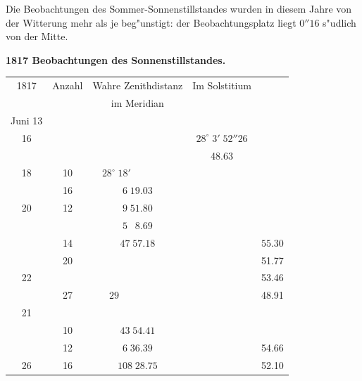 \documentclass[12pt,a4paper]{article}
\begin{document}
Die Beobachtungen des Sommer-Sonnenstillstandes wurden in diesem Jahre von der Witterung
mehr als je beg"unstigt: der Beobachtungsplatz liegt $0''16$ s"udlich von der Mitte.

\begin{center}
\textbf{1817 Beobachtungen des Sonnenstillstandes.}
\end{center}

\begin{center}
\small
\begin{tabular}{c|c|c|c|c}
\toprule
1817 & Anzahl & Wahre Zenithdistanz & Im Solstitium & \\
& & im Meridian & & \\
\midrule
Juni 13 & & & & \\
\phantom{13} 16 & & & $28^{\circ}\;3'\;52''26$ & \\
& & & \phantom{0}\phantom{0}\phantom{0}\phantom{0}\phantom{0}48.63 & \\
\phantom{13} 18 & 10 & $28^{\circ}\;18'\;\phantom{0}\phantom{0}\phantom{0}\phantom{0}\phantom{0}\phantom{0}\phantom{0}\phantom{0}$ & & \\
\phantom{13} & 16 & \phantom{0}\phantom{0}\phantom{0}\phantom{0}\phantom{0}$6\;19.03$ & & \\
\phantom{13} 20 & 12 & \phantom{0}\phantom{0}\phantom{0}\phantom{0}\phantom{0}$9\;51.80$ & & \\
\phantom{13} & & \phantom{0}\phantom{0}\phantom{0}\phantom{0}\phantom{0}$5\;\phantom{0}8.69$ & & \\
\phantom{13} & 14 & \phantom{0}\phantom{0}$47\;57.18$ & & \phantom{0}\phantom{0}\phantom{0}\phantom{0}\phantom{0}$55.30$ \\
\phantom{13} & 20 & & & \phantom{0}\phantom{0}\phantom{0}\phantom{0}\phantom{0}51.77 \\
\phantom{13} 22 & & & & \phantom{0}\phantom{0}\phantom{0}\phantom{0}\phantom{0}53.46 \\
\phantom{13} & 27 & $29\;\phantom{0}\phantom{0}\phantom{0}\phantom{0}\phantom{0}\phantom{0}\phantom{0}\phantom{0}\phantom{0}$ & & \phantom{0}\phantom{0}\phantom{0}\phantom{0}\phantom{0}48.91 \\
\phantom{13} 21 & & & & \\
\phantom{13} & 10 & \phantom{0}\phantom{0}$43\;54.41$ & & \\
\phantom{13} & 12 & \phantom{0}\phantom{0}\phantom{0}$6\;36.39$ & & \phantom{0}\phantom{0}\phantom{0}\phantom{0}\phantom{0}54.66 \\
\phantom{13} 26 & 16 & \phantom{0}$108\;28.75$ & & \phantom{0}\phantom{0}\phantom{0}\phantom{0}\phantom{0}52.10 \\

\end{tabular}
\end{center}
\end{document}

